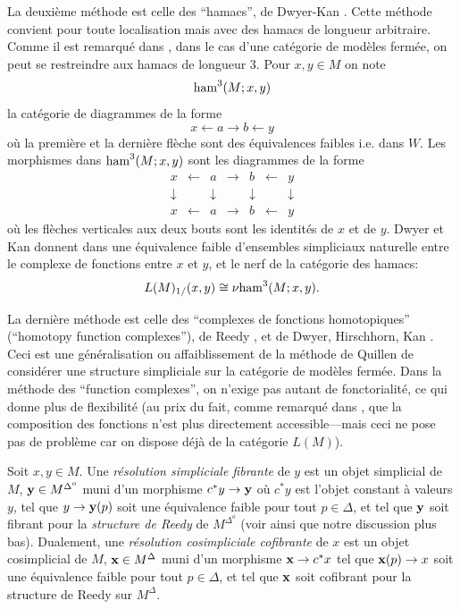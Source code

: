 \documentclass[12pt]{article}
\begin{document}
La deuxi\`eme m\'ethode est celle des
``hamacs'', de Dwyer-Kan \cite{DwyerKan2}. Cette m\'ethode convient pour toute
localisation mais avec des hamacs de longueur arbitraire. Comme il est
remarqu\'e
dans \cite{DwyerKan2}, dans le cas d'une cat\'egorie de mod\`eles ferm\'ee, on
peut se restreindre aux hamacs de longueur $3$. Pour $x,y\in M$ on note
$$
{\rm ham}^3(M; x,y)
$$
la cat\'egorie de diagrammes de la forme
$$
x\leftarrow a\rightarrow b \leftarrow y
$$
o\`u la premi\`ere et la derni\`ere fl\`eche sont des \'equivalences faibles
i.e. dans $W$. Les morphismes dans ${\rm ham}^3(M; x,y)$
sont les diagrammes de la forme
$$
\begin{array}{ccccccc}
x&\leftarrow &a&\rightarrow &b& \leftarrow &y\\
\downarrow &&\downarrow &&\downarrow && \downarrow \\
x&\leftarrow &a&\rightarrow &b& \leftarrow &y
\end{array}
$$
o\`u les fl\`eches verticales aux deux bouts sont les identit\'es de $x$ et
de $y$.
Dwyer et Kan donnent dans \cite{DwyerKan2} une \'equivalence faible
d'ensembles simpliciaux naturelle entre le complexe de fonctions entre $x$ et
$y$, et le nerf de la cat\'egorie des hamacs:
$$
L(M)_{1/}(x,y) \cong \nu  {\rm ham}^3(M; x,y).
$$

La derni\`ere m\'ethode est celle des ``complexes de fonctions homotopiques''
(``homotopy function complexes''), de Reedy \cite{Reedy}, et de Dwyer,
Hirschhorn, Kan \cite{DHK} \cite{Hirschhorn} \cite{DwyerKan3}. Ceci est une
g\'en\'eralisation ou affaiblissement de la m\'ethode de Quillen  \cite{Quillen}
de consid\'erer une structure simpliciale sur la cat\'egorie de mod\`eles
ferm\'ee.
Dans la m\'ethode des ``function complexes'',
on n'exige pas autant de fonctorialit\'e, ce qui donne
plus de flexibilit\'e (au prix du fait, comme remarqu\'e dans \cite{DHK}, que la
composition des fonctions n'est plus directement accessible---mais ceci ne pose
pas de probl\`eme car on dispose d\'ej\`a de la cat\'egorie $L(M)$).

Soit $x,y\in M$. Une {\em r\'esolution simpliciale fibrante} de $y$ est un objet
simplicial de $M$, ${\bf y}\in M^{\Delta ^o}$ muni d'un morphisme
$c^{\ast}y\rightarrow {\bf y}$ o\`u $c^{\ast} y$ est l'objet constant \`a
valeurs $y$, tel que $y\rightarrow {\bf y}(p)$ soit une \'equivalence
faible pour tout $p\in \Delta$, et tel que ${\bf y}$ soit fibrant pour la {\em
structure de Reedy} de  $M^{\Delta ^o}$ (voir \cite{Reedy} \cite{Hirschhorn}
\cite{DHK} \cite{JardineGoerssBook} ainsi que notre discussion plus bas).
Dualement, une  {\em r\'esolution cosimpliciale cofibrante} de $x$ est un objet
cosimplicial de $M$, ${\bf x}\in M^{\Delta}$ muni d'un
morphisme ${\bf x}\rightarrow
c^{\ast}x$ tel que ${\bf x}(p)\rightarrow x$ soit une \'equivalence faible pour
tout $p\in \Delta$, et tel que ${\bf x}$ soit cofibrant pour la structure de
Reedy sur $M^{\Delta}$.
\end{document}
